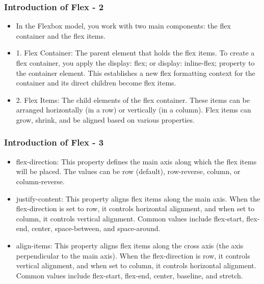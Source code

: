 \documentclass[aspectratio=169, table]{beamer}
\begin{document}
\begin{frame}
    \frametitle{Introduction of Flex - 2}
    \vskip1cm
    \begin{itemize}
        \item In the Flexbox model, you work with two main components: the flex container and the flex items.
	\item 1. Flex Container: The parent element that holds the flex items. To create a flex container, you apply the display: flex; or display: inline-flex; property to the container element. This establishes a new flex formatting context for the container and its direct children become flex items.
	\item 2. Flex Items: The child elements of the flex container. These items can be arranged horizontally (in a row) or vertically (in a column). Flex items can grow, shrink, and be aligned based on various properties.
    \end{itemize}
\end{frame}

\begin{frame}
    \frametitle{Introduction of Flex - 3}
    \vskip1cm
    \begin{itemize}
        \item flex-direction: This property defines the main axis along which the flex items will be placed. The values can be row (default), row-reverse, column, or column-reverse.
	\item justify-content: This property aligns flex items along the main axis. When the flex-direction is set to row, it controls horizontal alignment, and when set to column, it controls vertical alignment. Common values include flex-start, flex-end, center, space-between, and space-around.
	\item align-items: This property aligns flex items along the cross axis (the axis perpendicular to the main axis). When the flex-direction is row, it controls vertical alignment, and when set to column, it controls horizontal alignment. Common values include flex-start, flex-end, center, baseline, and stretch.
    \end{itemize}
\end{frame}
\end{document}
